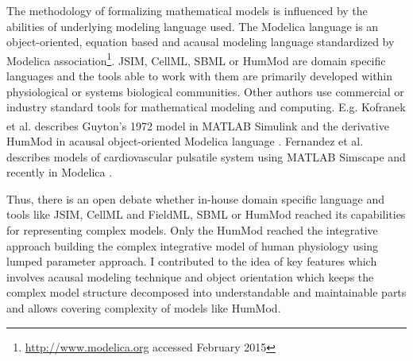 The methodology of formalizing mathematical models is influenced by the abilities of underlying modeling language used. 
The Modelica language is an object-oriented, equation based and acausal modeling language standardized by Modelica association\footnote{\url{http://www.modelica.org} accessed February 2015}.
JSIM, CellML, SBML or HumMod are domain specific languages and the tools able to work with them are primarily developed within physiological or systems biological communities. Other authors use commercial or industry standard tools for mathematical modeling and computing. E.g. Kofranek et al. describes Guyton's 1972 model in MATLAB\textsuperscript{\textregistered} Simulink \cite{Kofranek2010} and the derivative HumMod in acausal object-oriented Modelica language \cite{Kofranek2011hummod,kofranek2013hummod}. Fernandez et al. describes models of cardiovascular pulsatile system using MATLAB Simscape  \cite{FernandezDeCanete2013} and recently in Modelica  \cite{FernandezdeCanete2014}.

Thus, there is an open debate whether in-house domain specific language and tools like JSIM, CellML and FieldML, SBML or HumMod reached its capabilities for representing complex models. Only the HumMod reached the integrative approach building the complex integrative model of human physiology using lumped parameter approach. I contributed to the idea of key features which involves acausal modeling technique and object orientation which keeps the complex model structure decomposed into understandable and maintainable parts and allows covering complexity of models like HumMod. 

